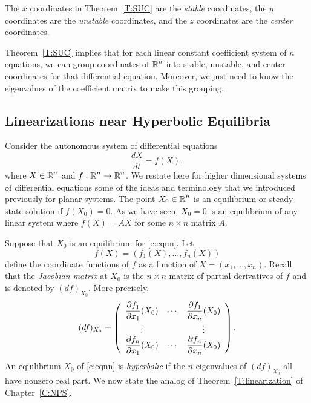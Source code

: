 \documentclass{ximera}
\begin{document}
\begin{definition}
The $x$ coordinates in Theorem~\ref{T:SUC} are the {\em stable\/} coordinates,
the $y$ coordinates are the {\em unstable\/} coordinates, and the $z$ 
coordinates are the {\em center\/} coordinates.
\end{definition} 

Theorem~\ref{T:SUC} implies that for each linear constant coefficient system
of $n$ equations, we can group coordinates of $\mbox{$\Bbb{R}$}^n$ into stable, unstable,
and center coordinates for that differential equation.  Moreover, we just 
need to know the eigenvalues of the coefficient matrix to make this grouping.


\subsection*{Linearizations near Hyperbolic Equilibria}

Consider the autonomous system of differential equations 
\begin{equation} \label{e:eqnn}
\frac{dX}{dt} = f(X),
\end{equation}
where $X\in\mbox{$\Bbb{R}$}^n$ and $f:\mbox{$\Bbb{R}$}^n\to\mbox{$\Bbb{R}$}^n$.  We restate here for higher dimensional 
systems of 
differential equations some of the ideas and terminology that we introduced
previously for planar systems.  The point $X_0\in\mbox{$\Bbb{R}$}^n$ is an equilibrium 
 or steady-state solution 
if $f(X_0)=0$.  As we have seen, 
$X_0=0$ is an equilibrium of any linear system where $f(X)=AX$ for some 
$n\times n$ matrix $A$. 

Suppose that $X_0$ is an equilibrium for \eqref{e:eqnn}.  Let 
\[
f(X) = (f_1(X),\ldots,f_n(X))
\]
define the coordinate functions of $f$ as a function of $X=(x_1,\ldots,x_n)$.
Recall that the {\em Jacobian matrix\/}
at $X_0$ is the $n\times n$ matrix of partial 
derivatives of $f$ and is denoted by $(df)_{X_0}$.  
  More precisely, 
\arraystart
\[
(df)_{X_0} = \left(\begin{array}{ccc}
\displaystyle\frac{\partial f_1}{\partial x_1}(X_0) & \cdots & 
\displaystyle\frac{\partial f_1}{\partial x_n}(X_0) \\ \vdots &  & \vdots \\
\displaystyle\frac{\partial f_n}{\partial x_1}(X_0) & \cdots & 
\displaystyle\frac{\partial f_n}{\partial x_n}(X_0) \end{array}\right).
\]
\arrayfinish
An equilibrium $X_0$ of \eqref{e:eqnn} is {\em hyperbolic\/} if the $n$
eigenvalues of $(df)_{X_0}$ all have nonzero real part. We now state 
the analog of Theorem~\ref{T:linearization} of Chapter~\ref{C:NPS}.
\end{document}
